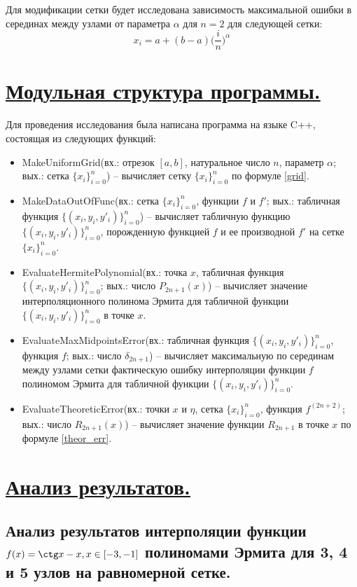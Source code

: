 \documentclass[a4paper, 12pt]{article}
\begin{document}
	Для модификации сетки будет исследована зависимость максимальной ошибки в серединах между узлами от параметра $\alpha$ для $n=2$ для следующей сетки:
    \begin{equation} \label{grid}
    	x_i=a+(b-a)\bigg(\frac{i}{n}\bigg)^\alpha
    \end{equation}
	
	\section{\underline{Модульная структура программы.}}
	Для проведения исследования была написана программа на языке C++, состоящая из следующих функций:
	\begin{itemize}
		\item MakeUniformGrid(вх.: отрезок $[a,b]$, натуральное число $n$, параметр $\alpha$; вых.: сетка $\{x_i\}_{i=0}^n$) -- вычисляет сетку $\{x_i\}_{i=0}^n$ по формуле \eqref{grid}.
		\item MakeDataOutOfFunc(вх.: сетка $\{x_i\}_{i=0}^n$, функции $f$ и $f'$; вых.: табличная функция $\{(x_i,y_i,y'_i)\}_{i=0}^n$) -- вычисляет табличную функцию $\{(x_i,y_i,y'_i)\}_{i=0}^n$, порожденную функцией $f$ и ее производной $f'$ на сетке $\{x_i\}_{i=0}^n$.
		\item EvaluateHermitePolynomial(вх.: точка $x$, табличная функция $\{(x_i,y_i,y'_i)\}_{i=0}^n$; вых.: число $P_{2n+1}(x)$) -- вычисляет значение интерполяционного полинома Эрмита для табличной функции $\{(x_i,y_i,y'_i)\}_{i=0}^n$ в точке $x$.
		\item EvaluateMaxMidpointsError(вх.: табличная функция $\{(x_i,y_i,y'_i)\}_{i=0}^n$, функция $f$; вых.: число $\delta_{2n+1}$) -- вычисляет максимальную по серединам между узлами сетки фактическую ошибку интерполяции функции $f$ полиномом Эрмита для табличной функции $\{(x_i,y_i,y'_i)\}_{i=0}^n$.
		\item EvaluateTheoreticError(вх.: точки $x$ и $\eta$, сетка $\{x_i\}_{i=0}^n$, функция $f^{(2n+2)}$; вых.: число $R_{2n+1}(x)$) -- вычисляет значение функции $R_{2n+1}$ в точке $x$ по формуле \eqref{theor_err}.
	\end{itemize}
	
	\section{\underline{Анализ результатов.}}
	
	\subsection{Анализ результатов интерполяции функции $f(x)=\ctg x-x, x\in[-3,-1]$ полиномами Эрмита для 3, 4 и 5 узлов на равномерной сетке.} 
	
\end{document}

